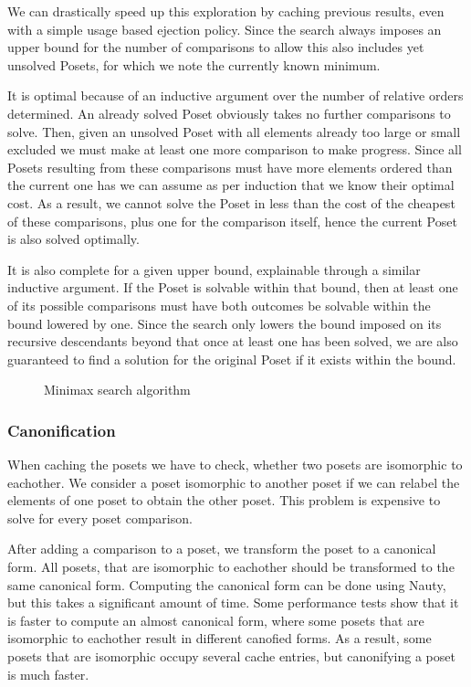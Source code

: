 \documentclass[10pt,journal,compsoc]{IEEEtran}
\begin{document}
We can drastically speed up this exploration by caching previous results, even with a simple usage
based ejection policy. Since the search always imposes an upper bound for the number of comparisons
to allow this also includes yet unsolved Posets, for which we note the currently known minimum.

It is optimal because of an inductive argument over the number of relative orders determined. An
already solved Poset obviously takes no further comparisons to solve. Then, given an unsolved Poset
with all elements already too large or small excluded we must make at least one more comparison to
make progress. Since all Posets resulting from these comparisons must have more elements ordered
than the current one has we can assume as per induction that we know their optimal cost. As a result, we
cannot solve the Poset in less than the cost of the cheapest of these comparisons, plus one for the
comparison itself, hence the current Poset is also solved optimally.

It is also complete for a given upper bound, explainable through a similar inductive argument. If
the Poset is solvable within that bound, then at least one of its possible comparisons must have both
outcomes be solvable within the bound lowered by one. Since the search only lowers the bound imposed
on its recursive descendants beyond that once at least one has been solved, we are also guaranteed
to find a solution for the original Poset if it exists within the bound.


\begin{figure}
  
  \caption{Minimax search algorithm}
  \label{fig:minimax_search}
\end{figure}

\subsubsection{Canonification}

When caching the posets we have to check, whether two posets are isomorphic to eachother.
We consider a poset isomorphic to another poset if we can relabel the elements of one poset to obtain the other poset.
This problem is expensive to solve for every poset comparison.

After adding a comparison to a poset, we transform the poset to a canonical form.
All posets, that are isomorphic to eachother should be transformed to the same canonical form.
Computing the canonical form can be done using Nauty, but this takes a significant amount of time.
Some performance tests show that it is faster to compute an almost canonical form, where some posets that are isomorphic to eachother result in different canofied forms.
As a result, some posets that are isomorphic occupy several cache entries, but canonifying a poset is much faster.
\end{document}
